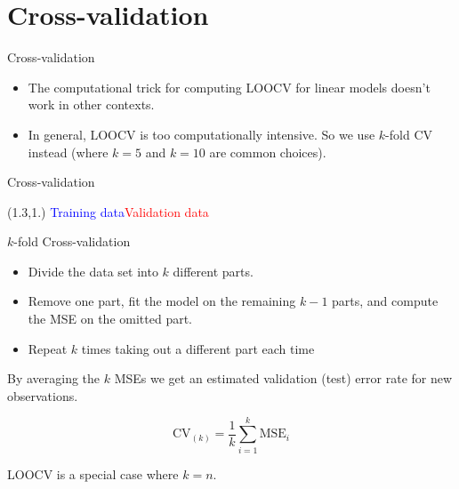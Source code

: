 \documentclass[14pt]{beamer}
\begin{document}
\section{Cross-validation}


\begin{frame}{Cross-validation}

\begin{itemize}
\item The computational trick for computing LOOCV for linear models doesn't work in other contexts.

\item In general, LOOCV is too computationally intensive. So we use $k$-fold CV instead (where $k=5$ and $k=10$ are common choices).
\end{itemize}

\end{frame}


\begin{frame}{Cross-validation}

\begin{textblock}{12}(1.3,1.)
\textcolor{blue}{Training data}\hspace*{4cm}\textcolor{red}{Validation data}
\end{textblock}


\end{frame}

\begin{frame}{$k$-fold Cross-validation}

\begin{itemize}
\item Divide the data set into $k$ different parts.
\item Remove one part, fit the model on the remaining
$k-1$ parts, and compute the MSE on the omitted part.
\item Repeat $k$ times taking out a different part each time
\end{itemize}\pause

By averaging the $k$ MSEs we get an estimated
validation (test) error rate for new observations.

\begin{block}{}
\[
\text{CV}_{(k)} = \frac{1}{k}\sum_{i=1}^k \text{MSE}_i
\]
\end{block}\pause

LOOCV is a special case where $k=n$.
\end{frame}
\end{document}
